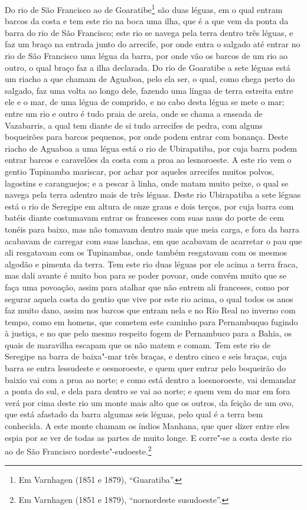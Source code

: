 Do rio de São Francisco ao de Goaratibe\footnote{ Em Varnhagen (1851 e 1879),
``Guaratiba''.} são duas léguas, em o qual entram barcos da costa e tem este rio na boca
uma ilha, que é a que vem da ponta da barra do rio de São Francisco; este rio se navega
pela terra dentro três léguas, e faz um braço na entrada junto do arrecife, por onde entra
o salgado até entrar no rio de São Francisco uma légua da barra, por onde vão os barcos de
um rio ao outro, o qual braço faz a ilha declarada. Do rio de Goaratibe a sete léguas está
um riacho a que chamam de Aguaboa, pelo ela ser, o qual, como chega perto do salgado, faz
uma volta ao longo dele, fazendo uma língua de terra estreita entre ele e o mar, de uma
légua de comprido, e no cabo desta légua se mete o mar; entre um rio e outro é tudo praia
de areia, onde se chama a enseada de Vazabarris, a qual tem diante de si tudo arrecifes de
pedra, com alguns boqueirões para barcos pequenos, por onde podem entrar com bonança.
Deste riacho de Aguaboa a uma légua está o rio de Ubirapatiba, por cuja barra podem entrar
barcos e caravelões da costa com a proa ao lesnoroeste. A este rio vem o gentio Tupinamba
mariscar, por achar por aqueles arrecifes muitos polvos, lagostins e caranguejos; e a
pescar à linha, onde matam muito peixe, o qual se navega pela terra adentro mais de três
léguas. Deste rio Ubirapatiba a sete léguas está o rio de Seregipe em altura de onze graus
e dois terços, por cuja barra com batéis diante costumavam entrar os franceses com suas
naus do porte de cem tonéis para baixo, mas não tomavam dentro mais que meia carga, e fora
da barra acabavam de carregar com suas lanchas, em que acabavam de acarretar o pau que ali
resgatavam com os Tupinambas, onde também resgatavam com os mesmos algodão e pimenta da
terra. Tem este rio duas léguas por ele acima a terra fraca, mas dali avante é muito boa
para se poder povoar, onde convém muito que se faça uma povoação, assim para atalhar que
não entrem ali franceses, como por segurar aquela costa do gentio que vive por este rio
acima, o qual todos os anos faz muito dano, assim nos barcos que entram nela e no Rio Real
no inverno com tempo, como em homens, que cometem este caminho para Pernambuquo fugindo à
justiça, e no que pelo mesmo respeito fogem de Pernambuco para a Bahia, os quais de
maravilha escapam que os não matem e comam. Tem este rio de Seregipe na barra de baixa"-mar
três braças, e dentro cinco e seis braças, cuja barra se entra lessudeste e oesnoroeste, e
quem quer entrar pelo boqueirão do baixio vai com a proa ao norte; e como está dentro a
loesnoroeste, vai demandar a ponta do sul, e dela para dentro se vai ao norte; e quem vem
do mar em fora verá por cima deste rio um monte mais alto que os outros, da feição de um
ovo, que está afastado da barra algumas seis léguas, pelo qual é a terra bem conhecida. A
este monte chamam os índios Manhana, que quer dizer entre eles espia por se ver de todas
as partes de muito longe. E corre"-se a costa deste rio ao de São Francisco
nordeste"-sudoeste.\footnote{ Em Varnhagen (1851 e 1879), ``nornordeste susudoeste''.}

